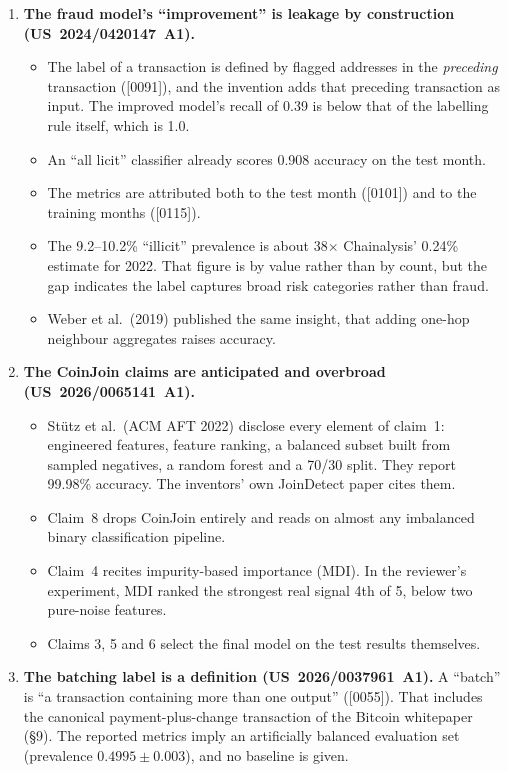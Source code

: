 \documentclass[10pt,a4paper]{article}
\begin{document}
\begin{enumerate}[label=\textbf{\arabic*.}]
  \item \textbf{The fraud model's ``improvement'' is leakage by construction (US~2024/0420147~A1).}
  \begin{itemize}
    \item The label of a transaction is defined by flagged addresses in the \emph{preceding} transaction ([0091]), and the invention adds that preceding transaction as input. The improved model's recall of 0.39 is below that of the labelling rule itself, which is 1.0.
    \item An ``all licit'' classifier already scores 0.908 accuracy on the test month.
    \item The metrics are attributed both to the test month ([0101]) and to the training months ([0115]).
    \item The 9.2--10.2\% ``illicit'' prevalence is about 38$\times$ Chainalysis' 0.24\% estimate for 2022. That figure is by value rather than by count, but the gap indicates the label captures broad risk categories rather than fraud.
    \item Weber et al.\ (2019) published the same insight, that adding one-hop neighbour aggregates raises accuracy.
  \end{itemize}
  \item \textbf{The CoinJoin claims are anticipated and overbroad (US~2026/0065141~A1).}
  \begin{itemize}
    \item St\"utz et al.\ (ACM AFT 2022) disclose every element of claim~1: engineered features, feature ranking, a balanced subset built from sampled negatives, a random forest and a 70/30 split. They report 99.98\% accuracy. The inventors' own JoinDetect paper cites them.
    \item Claim~8 drops CoinJoin entirely and reads on almost any imbalanced binary classification pipeline.
    \item Claim~4 recites impurity-based importance (MDI). In the reviewer's experiment, MDI ranked the strongest real signal 4th of 5, below two pure-noise features.
    \item Claims 3, 5 and 6 select the final model on the test results themselves.
  \end{itemize}
  \item \textbf{The batching label is a definition (US~2026/0037961~A1).} A ``batch'' is ``a transaction containing more than one output'' ([0055]). That includes the canonical payment-plus-change transaction of the Bitcoin whitepaper (\S9). The reported metrics imply an artificially balanced evaluation set (prevalence $0.4995\pm0.003$), and no baseline is given.

\end{enumerate}
\end{document}
